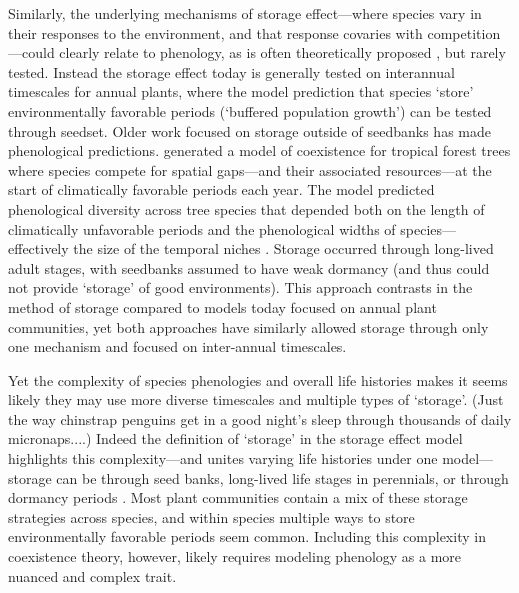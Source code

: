 \documentclass[11pt]{article}
\begin{document}
Similarly, the underlying mechanisms of storage effect---where species vary in their responses to the environment, and that response covaries with competition---could clearly relate to phenology, as is often theoretically proposed \citep{Chesson:1993gi,Chesson:2004eo}, but rarely tested. Instead the storage effect today is generally tested on interannual timescales for annual plants, where the model prediction that species `store' environmentally favorable periods (`buffered population growth') can be tested through seedset. Older work focused on storage outside of seedbanks has made phenological predictions. \citet{Kubo:1996qe} generated a model of coexistence for tropical forest trees where species compete for spatial gaps---and their associated resources---at the start of climatically favorable periods each year. The model predicted phenological diversity across tree species that depended both on the length of climatically unfavorable periods and the phenological widths of species---effectively the size of the temporal niches \citep{Kubo:1996qe}. Storage occurred through long-lived adult stages, with seedbanks assumed to have weak dormancy (and thus could not provide `storage' of good environments). This approach contrasts in the method of storage compared to models today focused on annual plant communities, yet both approaches have similarly allowed storage through only one mechanism and focused on inter-annual timescales.

Yet the complexity of species phenologies and overall life histories makes it seems likely they may use more diverse timescales and multiple types of `storage'. (Just the way chinstrap penguins get in a good night's sleep through thousands of daily micronaps....)  Indeed the definition of `storage' in the storage effect model highlights this complexity---and unites varying life histories under one model---storage can be through seed banks, long-lived life stages in perennials, or through dormancy periods \citep{Chesson:2000vd}. Most plant communities contain a mix of these storage strategies across species, and within species multiple ways to store environmentally favorable periods seem common. Including this complexity in coexistence theory, however, likely requires modeling phenology as a more nuanced and complex trait. 
\end{document}
